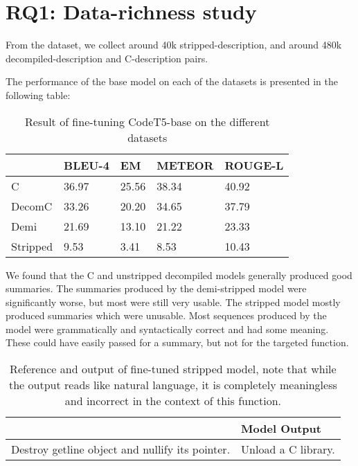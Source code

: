 \section{RQ1: Data-richness study}
From the dataset, we collect around 40k stripped-description, and around 480k decompiled-description and C-description pairs. 

The performance of the base model on each of the datasets is presented in the following table:
\label{tab:duplicated}
\begin{table}[!h]
\centering
\begin{tabular}{lllll} 
\hline
\rowcolor[rgb]{0.761,0.761,0.761} \multicolumn{1}{|l}{\textbf{Duplicated}} & BLEU-4 & EM    & METEOR & \multicolumn{1}{l|}{ROUGE-L}  \\ 
\hline
C                                                                          & 36.97  & 25.56 & 38.34  &  40.92                            \\
DecomC                                                                     & 33.26  & 20.20 & 34.65  & 37.79                             \\
Demi                                                                       & 21.69  & 13.10 & 21.22  &  23.33                             \\
Stripped                                                                   & 9.53   & 3.41  & 8.53  &  10.43                          
\end{tabular}
\caption{Result of fine-tuning CodeT5-base on the different datasets}
\end{table}

We found that the C and unstripped decompiled models generally produced good summaries. The summaries produced by the demi-stripped model were significantly worse, but most were still very usable. The stripped model mostly produced summaries which were unusable. Most sequences produced by the model were grammatically and syntactically correct and had some meaning. These could have easily passed for a summary, but not for the targeted function.

\label{tab:syntax}
\begin{table}[!h]
\centering
\begin{tabular}{ll}
\hline
\rowcolor[HTML]{9B9B9B} 
\multicolumn{1}{|l}{\cellcolor[HTML]{9B9B9B}Reference} & \multicolumn{1}{l|}{\cellcolor[HTML]{9B9B9B}Model Output}    \\ \hline
Destroy getline object and nullify its pointer.               & Unload a C library.
\end{tabular}
\caption{Reference and output of fine-tuned stripped model, note that while the output reads like natural language, it is completely meaningless and incorrect in the context of this function.}
\end{table}

